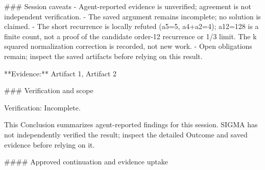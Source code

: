 \documentclass[11pt]{article}
\begin{document}
\#\#\# Session caveats
- Agent-reported evidence is unverified; agreement is not independent verification.
- The saved argument remains incomplete; no solution is claimed.
- The short recurrence is locally refuted (a5=5, a4+a2=4); a12=128 is a finite count, not a proof of the candidate order-12 recurrence or 1/3 limit. The k squared normalization correction is recorded, not new work.
- Open obligations remain; inspect the saved artifacts before relying on this result.

**Evidence:** Artifact 1, Artifact 2

\#\#\# Verification and scope

Verification: Incomplete.

This Conclusion summarizes agent-reported findings for this session. SIGMA has not independently verified the result; inspect the detailed Outcome and saved evidence before relying on it.

\#\#\#\# Approved continuation and evidence uptake
\end{document}

